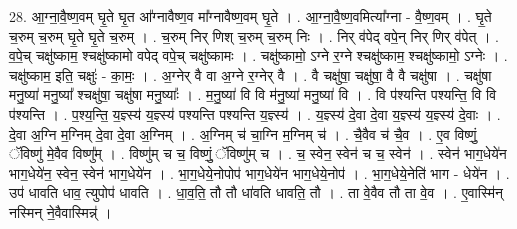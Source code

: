 \documentclass[17pt]{extarticle}
\begin{document}
28. आ॒ग्ना॒वै॒ष्ण॒वम् घृ॒ते घृ॒त आ᳚ग्नावैष्ण॒व मा᳚ग्नावैष्ण॒वम् घृ॒ते । . आ॒ग्ना॒वै॒ष्ण॒वमित्या᳚ग्ना - वै॒ष्ण॒वम् । . घृ॒ते च॒रुम् च॒रुम् घृ॒ते घृ॒ते च॒रुम् । . च॒रुम् निर् णिश् च॒रुम् च॒रुम् निः । . निर् व॑पेद् वपे॒न् निर् णिर् व॑पेत् । . व॒पे॒च् चक्षु॑ष्काम॒ श्चक्षु॑ष्कामो वपेद् वपे॒च् चक्षु॑ष्कामः । . चक्षु॑ष्कामो॒ ऽग्ने र॒ग्ने श्चक्षु॑ष्काम॒ श्चक्षु॑ष्कामो॒ ऽग्नेः । . चक्षु॑ष्काम॒ इति॒ चक्षुः॑ - का॒मः॒ । . अ॒ग्नेर् वै वा अ॒ग्ने र॒ग्नेर् वै । . वै चक्षु॑षा॒ चक्षु॑षा॒ वै वै चक्षु॑षा । . चक्षु॑षा मनु॒ष्या॑ मनु॒ष्या᳚ श्चक्षु॑षा॒ चक्षु॑षा मनु॒ष्याः᳚ । . म॒नु॒ष्या॑ वि वि म॑नु॒ष्या॑ मनु॒ष्या॑ वि । . वि प॑श्यन्ति पश्यन्ति॒ वि वि प॑श्यन्ति । . प॒श्य॒न्ति॒ य॒ज्ञ्स्य॑ य॒ज्ञ्स्य॑ पश्यन्ति पश्यन्ति य॒ज्ञ्स्य॑ । . य॒ज्ञ्स्य॑ दे॒वा दे॒वा य॒ज्ञ्स्य॑ य॒ज्ञ्स्य॑ दे॒वाः । . दे॒वा अ॒ग्नि म॒ग्निम् दे॒वा दे॒वा अ॒ग्निम् । . अ॒ग्निम् च॑ चा॒ग्नि म॒ग्निम् च॑ । . चै॒वैव च॑ चै॒व । . ए॒व विष्णुं॒ ॅविष्णु॑ मे॒वैव विष्णु᳚म् । . विष्णु॑म् च च॒ विष्णुं॒ ॅविष्णु॑म् च । . च॒ स्वेन॒ स्वेन॑ च च॒ स्वेन॑ । . स्वेन॑ भाग॒धेये॑न भाग॒धेये॑न॒ स्वेन॒ स्वेन॑ भाग॒धेये॑न । . भा॒ग॒धेये॒नोपोप॑ भाग॒धेये॑न भाग॒धेये॒नोप॑ । . भा॒ग॒धेये॒नेति॑ भाग - धेये॑न । . उप॑ धावति धाव॒ त्युपोप॑ धावति । . धा॒व॒ति॒ तौ तौ धा॑वति धावति॒ तौ । . ता वे॒वैव तौ ता वे॒व । . ए॒वास्मि॑न् नस्मिन् ने॒वैवास्मिन्न्॑ । \newline
\end{document}
